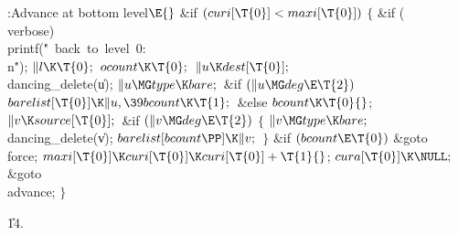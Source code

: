 \Y\B\4:Advance at bottom level\X${}\E{}$\6
\&{if} ${}(\\{curi}[\T{0}]<\\{maxi}[\T{0}]){}$\5
${}\{{}$\1\6
\&{if} (\\{verbose})\1\5
\\{printf}(\.{"\ back\ to\ level\ 0:\\n}\)\.{"});\2\6
${}\|l\K\T{0};{}$\6
${}\\{ocount}\K\T{0};{}$\6
${}\|u\K\\{dest}[\T{0}];{}$\6
\\{dancing\_delete}(\|u);\6
${}\|u\MG\\{type}\K\\{bare};{}$\6
\&{if} ${}(\|u\MG\\{deg}\E\T{2}){}$\1\5
${}\\{barelist}[\T{0}]\K\|u,\39\\{bcount}\K\T{1};{}$\2\6
\&{else}\1\5
${}\\{bcount}\K\T{0}{}$;\2\6
${}\|v\K\\{source}[\T{0}];{}$\6
\&{if} ${}(\|v\MG\\{deg}\E\T{2}){}$\5
${}\{{}$\1\6
${}\|v\MG\\{type}\K\\{bare};{}$\6
\\{dancing\_delete}(\|v);\6
${}\\{barelist}[\\{bcount}\PP]\K\|v;{}$\6
\4${}\}{}$\2\6
\&{if} ${}(\\{bcount}\E\T{0}){}$\1\5
\&{goto} \\{force};\2\6
${}\\{maxi}[\T{0}]\K\\{curi}[\T{0}]\K\\{curi}[\T{0}]+\T{1}{}$;\6
${}\\{cura}[\T{0}]\K\NULL;{}$\6
\&{goto} \\{advance};\6
\4${}\}{}$\2\par
\U14.\fi

